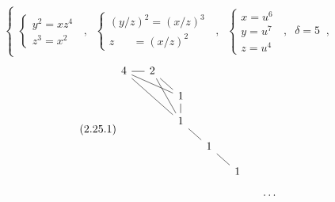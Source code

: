 \begin{equation}\tag{2.25.1}
\left\{
\begin{array}{l}
\left\{\begin{array}{l} y^{2} = xz^{4} \\ z^{3} = x^{2} \end{array}\right. \;\;,\;\;
\left\{\begin{array}{l} (y/z)^{2} = (x/z)^{3} \\ z \;\;\;\;\;\; = (x/z)^{2} \end{array}\right. \;\;,\;\;
\left\{\begin{array}{l} x = u^{6} \\ y = u^{7} \\ z = u^{4} \end{array}\right. \;\;,\;\; \delta = 5 \;\;,
\end{array}
\right.
\end{equation}
\begin{equation}\tag{2.25.1}
\begin{tikzcd}[column sep=small, row sep=small]
4 \arrow[r, dash] \arrow[rrd, dash] \arrow[rrdd, dash] & 2 \arrow[rd, dash] \arrow[rdd, dash] & {} & {} & {} & {} \\
{} & {} & 1 \arrow[d, dash] & {} & {} & {} \\
{} & {} & 1 \arrow[rd, dash] & {} & {} & {} \\
{} & {} & {} & 1 \arrow[rd, dash] & {} & {} \\
{} & {} & {} & {} & 1 & {} \\
{} & {} & {} & {} & {} & \cdots
\end{tikzcd}
\end{equation}
